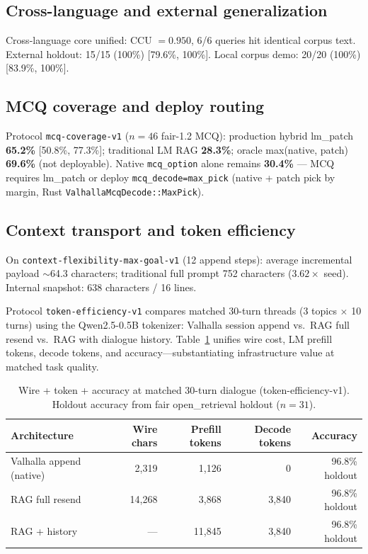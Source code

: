 \documentclass[11pt,a4paper]{article}
\begin{document}
\subsection{Cross-language and external generalization}

Cross-language core unified: CCU $=0.950$, 6/6 queries hit identical corpus text. External holdout: 15/15 (100\%) [79.6\%, 100\%]. Local corpus demo: 20/20 (100\%) [83.9\%, 100\%].

\subsection{MCQ coverage and deploy routing}

Protocol \texttt{mcq-coverage-v1} ($n=46$ fair-1.2 MCQ): production hybrid lm\_patch \textbf{65.2\%} [50.8\%, 77.3\%]; traditional LM RAG \textbf{28.3\%}; oracle max(native, patch) \textbf{69.6\%} (not deployable). Native \texttt{mcq\_option} alone remains \textbf{30.4\%} --- MCQ requires lm\_patch or deploy \texttt{mcq\_decode=max\_pick} (native + patch pick by margin, Rust \texttt{ValhallaMcqDecode::MaxPick}).

\subsection{Context transport and token efficiency}

On \texttt{context-flexibility-max-goal-v1} (12 append steps): average incremental payload $\sim$64.3 characters; traditional full prompt 752 characters ($3.62\times$ seed). Internal snapshot: 638 characters / 16 lines.

Protocol \texttt{token-efficiency-v1} compares matched 30-turn threads (3 topics $\times$ 10 turns) using the Qwen2.5-0.5B tokenizer: Valhalla session append vs.\ RAG full resend vs.\ RAG with dialogue history. Table~\ref{tab:token-efficiency} unifies wire cost, LM prefill tokens, decode tokens, and accuracy---substantiating infrastructure value at matched task quality.

\begin{table}[h]
\centering
\small
\caption{Wire + token + accuracy at matched 30-turn dialogue (token-efficiency-v1). Holdout accuracy from fair open\_retrieval holdout ($n=31$).}
\label{tab:token-efficiency}
\begin{tabular}{lrrrr}
\toprule
Architecture & Wire chars & Prefill tokens & Decode tokens & Accuracy \\
\midrule
Valhalla append (native) & 2{,}319 & 1{,}126 & 0 & 96.8\% holdout \\
RAG full resend & 14{,}268 & 3{,}868 & 3{,}840 & 96.8\% holdout \\
RAG + history & --- & 11{,}845 & 3{,}840 & 96.8\% holdout \\
\bottomrule
\end{tabular}
\end{table}
\end{document}
